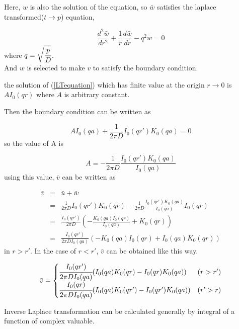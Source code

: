 \documentclass{article}
\begin{document}
Here, $w$ is also the solution of the equation, so $\bar{w}$ satisfies the laplace transformed($t \rightarrow p$) equation,

\begin{equation}
    \frac{d^2 \bar{w}}{dr^2} + \frac{1}{r}\frac{d\bar{w}}{dr} - q^2 \bar{w} = 0
    \label{LTequation}
\end{equation}
where $q = \sqrt{\cfrac{p}{D}}$.\\

And $w$ is selected to make $v$ to satisfy the boundary condition.

the solution of (\ref{LTequation}) which has finite value at the origin
$r \rightarrow 0$ is $AI_0(qr)$ where $A$ is arbitrary constant.

Then the boundary condition can be written as

\begin{equation}
    AI_0(qa) + \frac{1}{2 \pi D} I_0(qr') K_0(qa) = 0
\end{equation}
so the value of A is

\begin{equation}
    A = - \frac{1}{2 \pi D} \frac{I_0(qr') K_0(qa)}{I_0(qa)}
\end{equation}
using this value, $\bar{v}$ can be written as

\begin{eqnarray}
    \bar{v} &=& \bar{u} + \bar{w} \nonumber \\
            &=& \frac{1}{2\pi D} I_0(qr')K_0(qr)
                - \frac{1}{2 \pi D} \frac{I_0(qr') K_0(qa)}{I_0(qa)}I_0(qr)
                \nonumber \\
            &=& \frac{I_0(qr')}{2 \pi D}
                \left( -\frac{K_0(qa)I_0(qr)}{I_0(qa)} + K_0(qr) \right)
                \nonumber \\
            &=& \frac{I_0(qr')}{2\pi D I_0(qa)}
                \left( -K_0(qa)I_0(qr) + I_0(qa)K_0(qr) \right)
\end{eqnarray}
in $r > r'$. In the case of $r < r'$, $\bar{v}$ can be obtained like this way.

\[
    \bar{v} = \begin{cases}
        \cfrac{I_0(qr')}{2 \pi D I_0(qa)}(I_0(qa)K_0(qr) - I_0(qr)K_0(qa)) & (r > r') \\
        \cfrac{I_0(qr)}{2 \pi D I_0(qa)}(I_0(qa)K_0(qr') - I_0(qr')K_0(qa)) & (r' > r)
    \end{cases}
\]

Inverse Laplace transformation can be calculated generally
by integral of a function of complex valuable.
\end{document}
